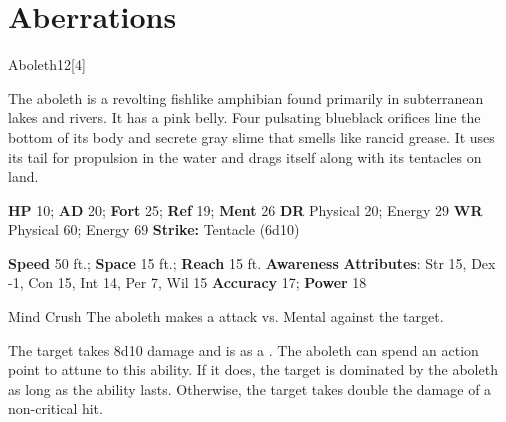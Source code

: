 
        \section{Aberrations}
      
  \begin{monsection}{Aboleth}{12}[4]
    \vspace{-1em}\vspace{-1em}
    \vspace{0em}

    
    The aboleth is a revolting fishlike amphibian found primarily in subterranean lakes and rivers.
    It has a pink belly.
    Four pulsating blueblack orifices line the bottom of its body and secrete gray slime that smells like rancid grease.
    It uses its tail for propulsion in the water and drags itself along with its tentacles on land.
  

    \begin{spellcontent}
      \begin{spelltargetinginfo}
        \pari \textbf{HP} 10;
          \textbf{AD} 20;
          \textbf{Fort} 25;
          \textbf{Ref} 19;
          \textbf{Ment} 26
        \pari \textbf{DR} Physical 20; Energy 29
        \pari \textbf{WR} Physical 60; Energy 69
        \pari \textbf{Strike:}
            Tentacle  (6d10)
      \end{spelltargetinginfo}
    \end{spellcontent}
    \begin{monsterfooter}
      \pari \textbf{Speed} 50 ft.;
        \textbf{Space} 15 ft.;
        \textbf{Reach} 15 ft.
      \pari \textbf{Awareness} 
      \pari \textbf{Attributes}:
        Str 15, Dex -1,
        Con 15, Int 14,
        Per 7, Wil 15
      \pari \textbf{Accuracy} 17;
        \textbf{Power} 18
    \end{monsterfooter}
  \end{monsection}
  \begin{freeability}{Mind Crush}
      The aboleth makes a  attack
        vs. Mental against the target.
    
    \hit The target takes 8d10  damage and is  as a .
    \crit 
          The aboleth can spend an action point to attune to this ability.
          If it does, the target is dominated by the aboleth as long as the ability lasts.
          Otherwise, the target takes double the damage of a non-critical hit.
    \end{freeability}
  

